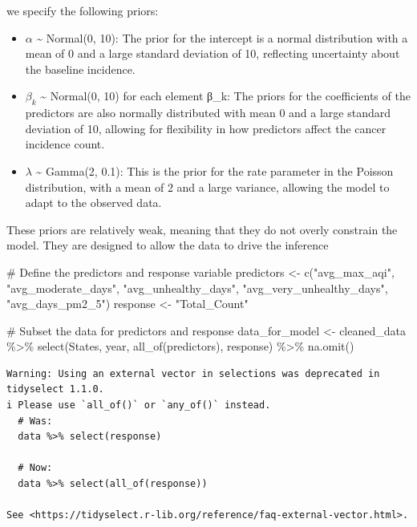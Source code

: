 \documentclass[
  12pt,
]{article}
\newenvironment{Shaded}{\begin{snugshade}}{\end{snugshade}}
\newcommand{\CommentTok}[1]{\textcolor[rgb]{0.37,0.37,0.37}{#1}}
\newcommand{\FunctionTok}[1]{\textcolor[rgb]{0.28,0.35,0.67}{#1}}
\newcommand{\NormalTok}[1]{\textcolor[rgb]{0.00,0.23,0.31}{#1}}
\newcommand{\OtherTok}[1]{\textcolor[rgb]{0.00,0.23,0.31}{#1}}
\newcommand{\SpecialCharTok}[1]{\textcolor[rgb]{0.37,0.37,0.37}{#1}}
\newcommand{\StringTok}[1]{\textcolor[rgb]{0.13,0.47,0.30}{#1}}
\begin{document}
we specify the following priors:

\begin{itemize}
\item
  \(α\) \textasciitilde{} Normal(0, 10): The prior for the intercept is
  a normal distribution with a mean of 0 and a large standard deviation
  of 10, reflecting uncertainty about the baseline incidence.
\item
  \(β_k\) \textasciitilde{} Normal(0, 10) for each element β\_k: The
  priors for the coefficients of the predictors are also normally
  distributed with mean 0 and a large standard deviation of 10, allowing
  for flexibility in how predictors affect the cancer incidence count.
\item
  \(λ\) \textasciitilde{} Gamma(2, 0.1): This is the prior for the rate
  parameter in the Poisson distribution, with a mean of 2 and a large
  variance, allowing the model to adapt to the observed data.
\end{itemize}

These priors are relatively weak, meaning that they do not overly
constrain the model. They are designed to allow the data to drive the
inference

\begin{Shaded}
\begin{Highlighting}[]
\CommentTok{\# Define the predictors and response variable}
\NormalTok{predictors }\OtherTok{\textless{}{-}} \FunctionTok{c}\NormalTok{(}\StringTok{"avg\_max\_aqi"}\NormalTok{, }\StringTok{"avg\_moderate\_days"}\NormalTok{, }\StringTok{"avg\_unhealthy\_days"}\NormalTok{, }\StringTok{"avg\_very\_unhealthy\_days"}\NormalTok{, }\StringTok{"avg\_days\_pm2\_5"}\NormalTok{)}
\NormalTok{response }\OtherTok{\textless{}{-}} \StringTok{"Total\_Count"}

\CommentTok{\# Subset the data for predictors and response}
\NormalTok{data\_for\_model }\OtherTok{\textless{}{-}}\NormalTok{ cleaned\_data }\SpecialCharTok{\%\textgreater{}\%}
  \FunctionTok{select}\NormalTok{(States, year, }\FunctionTok{all\_of}\NormalTok{(predictors), response) }\SpecialCharTok{\%\textgreater{}\%}
  \FunctionTok{na.omit}\NormalTok{()}
\end{Highlighting}
\end{Shaded}

\begin{verbatim}
Warning: Using an external vector in selections was deprecated in tidyselect 1.1.0.
i Please use `all_of()` or `any_of()` instead.
  # Was:
  data %>% select(response)

  # Now:
  data %>% select(all_of(response))

See <https://tidyselect.r-lib.org/reference/faq-external-vector.html>.
\end{verbatim}
\end{document}

